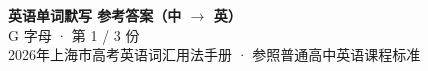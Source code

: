 \documentclass[10pt,a4paper]{article}
\begin{document}
\pagestyle{plain}

\begin{center}
{\LARGE\bfseries 英语单词默写 \quad 参考答案（中 $\to$ 英）}\\[0.22em]
{\large G 字母 · 第 1 / 3 份}\\[0.18em]
{\small 2026年上海市高考英语词汇用法手册 · 参照普通高中英语课程标准}
\end{center}

\vspace{0.2em}
\noindent{\color{rulegray}\rule{\textwidth}{0.8pt}}

\vspace{0.35em}

\vspace{0.25em}
\renewcommand{\arraystretch}{1.32}
\end{document}

